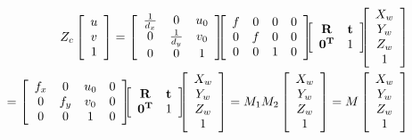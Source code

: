 \begin{eqnarray}\label{eq:2_1_image_and_world_transform}
Z_c
\left[\begin{array}{c} u \\ v \\ 1 \end{array} \right]
=
\left[\begin{array}{ccc}
\frac{1}{d_x} & 0 & u_0 \\
0 & \frac{1}{d_y} & v_0 \\
0 & 0 & 1
\end{array}\right]
\hspace{-6pt}
\left[\begin{array}{cccc}
f & 0 & 0 & 0 \\
0 & f & 0 & 0 \\
0 & 0 & 1 & 0
\end{array}\right]
\hspace{-6pt}
\left[\begin{array}{cc}
\mathbf{R} & \mathbf{t}  \\
\mathbf{0^T} & 1
\end{array}\right]
\hspace{-6pt}
\left[\begin{array}{c} X_w \\ Y_w \\ Z_w \\ 1 \end{array}\right]
\\
= 
\left[\begin{array}{cccc}
f_x & 0 & u_0 & 0 \\
0 & f_y & v_0 & 0 \\
0 & 0 & 1 & 0
\end{array}\right]
\hspace{-6pt}
\left[\begin{array}{cc}
\mathbf{R} & \mathbf{t}  \\
\mathbf{0^T} & 1
\end{array}\right]
\hspace{-6pt}
\left[\begin{array}{c} X_w \\ Y_w \\ Z_w \\ 1 \end{array}\right]
=
M_1 M_2
\left[\begin{array}{c} X_w \\ Y_w \\ Z_w \\ 1 \end{array}\right]
= M
\left[\begin{array}{c} X_w \\ Y_w \\ Z_w \\ 1 \end{array}\right]
\end{eqnarray}

